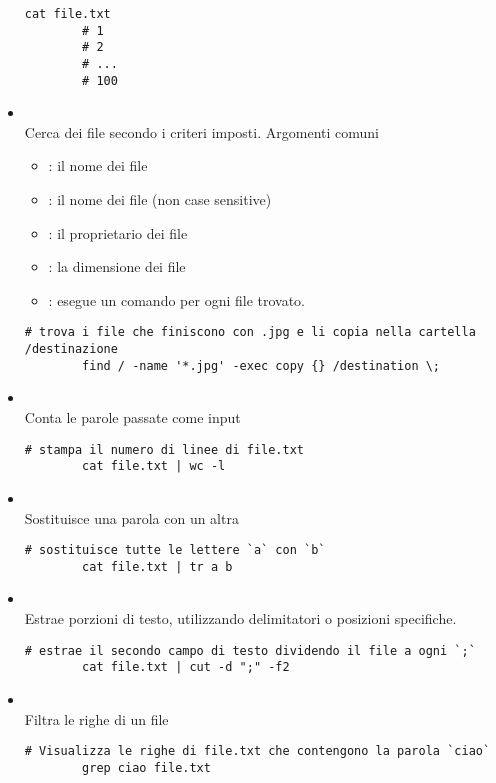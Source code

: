 \documentclass[../main.tex]{subfiles}
\begin{document}
\begin{itemize}
\begin{lstlisting}[style=bash]
        cat file.txt
        # 1
        # 2
        # ...
        # 100
    \end{lstlisting}
    \item {} \\
    Cerca dei file secondo i criteri imposti. Argomenti comuni
    \begin{itemize}
        \item {}: il nome dei file
        \item {}: il nome dei file (non case sensitive)
        \item {}: il proprietario dei file
        \item {}: la dimensione dei file
        \item {}: esegue un comando per ogni file trovato. 
    \end{itemize}
    \begin{lstlisting}[style=bash]
        # trova i file che finiscono con .jpg e li copia nella cartella /destinazione
        find / -name '*.jpg' -exec copy {} /destination \;
    \end{lstlisting}
    \item {} \\
    Conta le parole passate come input
    \begin{lstlisting}[style=bash]
        # stampa il numero di linee di file.txt
        cat file.txt | wc -l
    \end{lstlisting}
    \item {} \\
    Sostituisce una parola con un altra
    \begin{lstlisting}[style=bash]
        # sostituisce tutte le lettere `a` con `b`
        cat file.txt | tr a b
    \end{lstlisting}
    \item {} \\
    Estrae porzioni di testo, utilizzando delimitatori o posizioni specifiche.
    \begin{lstlisting}[style=bash]
        # estrae il secondo campo di testo dividendo il file a ogni `;`
        cat file.txt | cut -d ";" -f2
    \end{lstlisting}
    \item {} \\
    Filtra le righe di un file
    \begin{lstlisting}[style=bash]
        # Visualizza le righe di file.txt che contengono la parola `ciao`
        grep ciao file.txt
    \end{lstlisting}
\end{itemize}
\end{document}

